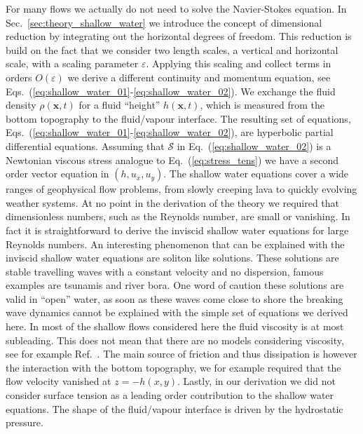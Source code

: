 For many flows we actually do not need to solve the Navier-Stokes equation.
In Sec.~\ref{sec:theory_shallow_water} we introduce the concept of dimensional reduction by integrating out the horizontal degrees of freedom.
This reduction is build on the fact that we consider two length scales, a vertical and horizontal scale, with a scaling parameter $\varepsilon$. 
Applying this scaling and collect terms in orders $O(\varepsilon)$ we derive a different continuity and momentum equation, see Eqs.~(\ref{eq:shallow_water_01}-\ref{eq:shallow_water_02}).
We exchange the fluid density $\rho(\mathbf{x},t)$ for a fluid ``height'' $h(\mathbf{x},t)$, which is measured from the bottom topography to the fluid/vapour interface.
The resulting set of equations, Eqs.~(\ref{eq:shallow_water_01}-\ref{eq:shallow_water_02}), are hyperbolic partial differential equations.
Assuming that $\mathcal{S}$ in Eq.~(\ref{eq:shallow_water_02}) is a Newtonian viscous stress analogue to Eq.~(\ref{eq:stress_tens}) we have a second order vector equation in $(h, u_x, u_y)$.  
The shallow water equations cover a wide ranges of geophysical flow problems, from slowly creeping lava to quickly evolving weather systems.
At no point in the derivation of the theory we required that dimensionless numbers, such as the Reynolds number, are small or vanishing. 
In fact it is straightforward to derive the inviscid shallow water equations for large Reynolds numbers. 
An interesting phenomenon that can be explained with the inviscid shallow water equations are soliton like solutions.
These solutions are stable travelling waves with a constant velocity and no dispersion, famous examples are tsunamis and river bora.
One word of caution these solutions are valid in ``open'' water, as soon as these waves come close to shore the breaking wave dynamics cannot be explained with the simple set of equations we derived here. 
In most of the shallow flows considered here the fluid viscosity is at most subleading.
This does not mean that there are no models considering viscosity, see for example Ref.~\cite{marcheDerivationNewTwodimensional2007}.
The main source of friction and thus dissipation is however the interaction with the bottom topography, we for example required that the flow velocity vanished at $z = -h(x,y)$.
Lastly, in our derivation we did not consider surface tension as a leading order contribution to the shallow water equations.
The shape of the fluid/vapour interface is driven by the hydrostatic pressure.

